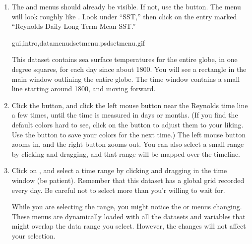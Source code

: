 \begin{enumerate}

\item The  and  menus should
already be visible.  If not, use the 
button. The  menu will look roughly like
.  Look under ``SST,'' then click on the entry
marked ``Reynolds Daily Long Term Mean SST.''


{gui,intro,datamenu}{dsetmenu.ps}{dsetmenu.gif}{}
  
  This dataset contains sea surface temperatures for the entire globe,
  in one degree squares, for each day since about 1800. You will see a
  rectangle in the main window outlining the entire globe.  The time
  window contains a small line starting around 1800, and moving
  forward.

\item Click the  button, and click the left mouse button
  near the Reynolds time line a few times, until the time is measured
  in days or months. (If you find the default colors hard to see,
  click on the  button to adjust them to your
  liking. Use the  button to save
  your colors for the next time.)  The left mouse button zooms in, and
  the right button zooms out.  You can also select a small range by
  clicking and dragging, and that range will be mapped over the
  timeline.
  
\item Click on , and select a time range by
  clicking and dragging in the time window (be patient). Remember that
  this dataset has a global grid recorded every day.  Be careful not
  to select more than you'r willing to wait for.
  
  While you are selecting the range, you might notice the
   or  menus changing.  These menus
  are dynamically loaded with all the datasets and variables that
  might overlap the data range you select.  However, the changes will
  not affect your selection.


\end{enumerate}
